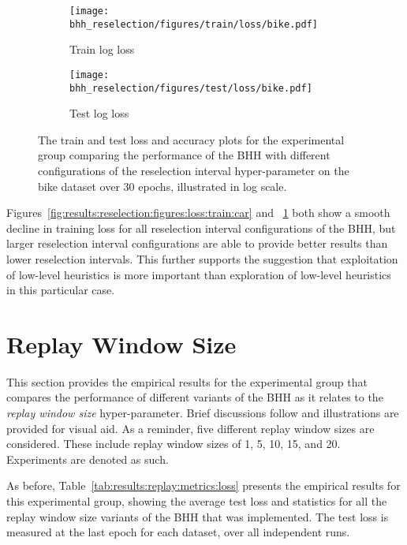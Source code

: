 \begin{figure}[htbp]
      \begin{subfigure}{0.5\textwidth}
            \centering
            \texttt{[image: bhh\_reselection/figures/train/loss/bike.pdf]}
            \caption{Train log loss}
            \label{fig:results:reselection:figures:loss:train:bike}
      \end{subfigure}
      \begin{subfigure}{0.5\textwidth}
            \centering
            \texttt{[image: bhh\_reselection/figures/test/loss/bike.pdf]}
            \caption{Test log loss}
            \label{fig:results:reselection:figures:loss:test:bike}
      \end{subfigure}
      \par\bigskip
      \caption{The train and test loss and accuracy plots for the experimental group comparing the performance of the \acs{BHH} with different configurations of the reselection interval hyper-parameter on the bike dataset over 30 epochs, illustrated in log scale.}
      \label{fig:results:reselection:figures:bike}
\end{figure}

Figures~\ref{fig:results:reselection:figures:loss:train:car} and ~\ref{fig:results:reselection:figures:loss:train:bike} both show a smooth decline in training loss for all reselection interval configurations of the \acs{BHH}, but larger reselection interval configurations are able to provide better results than lower reselection intervals. This further supports the suggestion that exploitation of low-level heuristics is more important than exploration of low-level heuristics in this particular case.

\section{Replay Window Size}\label{sec:results:replay}

This section provides the empirical results for the experimental group that compares the performance of different variants of the \acs{BHH} as it relates to the \textit{replay window size} hyper-parameter. Brief discussions follow and illustrations are provided for visual aid. As a reminder, five different replay window sizes are considered. These include replay window sizes of 1, 5, 10, 15, and 20. Experiments are denoted as such.

As before, Table~\ref{tab:results:replay:metrics:loss} presents the empirical results for this experimental group, showing the average test loss and statistics for all the replay window size variants of the \acs{BHH} that was implemented. The test loss is measured at the last epoch for each dataset, over all independent runs.

